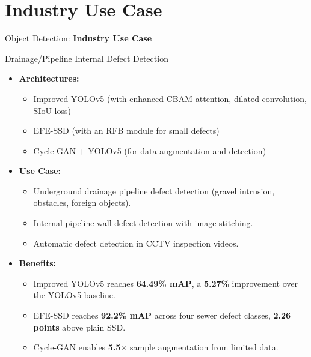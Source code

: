 \section{Industry Use Case}
\begin{frame}{}
    \LARGE Object Detection: \textbf{Industry Use Case}
\end{frame}

\begin{frame}[allowframebreaks]{Drainage/Pipeline Internal Defect Detection}
\begin{itemize}
    \item \textbf{Architectures:}
    \begin{itemize}
        \item Improved YOLOv5 (with enhanced CBAM attention, dilated convolution, SIoU loss)
        \item EFE-SSD (with an RFB module for small defects)
        \item Cycle-GAN + YOLOv5 (for data augmentation and detection)
    \end{itemize}

    \item \textbf{Use Case:}
    \begin{itemize}
        \item Underground drainage pipeline defect detection (gravel intrusion, obstacles, foreign objects).
        \item Internal pipeline wall defect detection with image stitching.
        \item Automatic defect detection in CCTV inspection videos.
    \end{itemize}

\framebreak

    \item \textbf{Benefits:}
    \begin{itemize}
        \item Improved YOLOv5 reaches \textbf{64.49\% mAP}, a \textbf{5.27\%} improvement over the YOLOv5 baseline.
        \item EFE-SSD reaches \textbf{92.2\% mAP} across four sewer defect classes, \textbf{2.26 points} above plain SSD.
        \item Cycle-GAN enables \textbf{5.5$\times$} sample augmentation from limited data.
    \end{itemize}


\end{itemize}
\end{frame}
